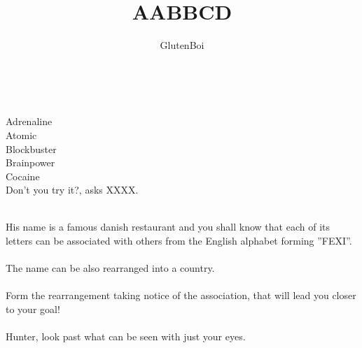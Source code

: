 \documentclass[12pt,a4paper]{article}
\author{GlutenBoi}
\title{AABBCD}
\date{}
\begin{document}
\maketitle
\ \\
\begin{center}
Adrenaline\\
Atomic\\
Blockbuster\\
Brainpower\\
Cocaine\\
Don't you try it?, asks XXXX.\\
\end{center}
\ \\
His name is a famous danish restaurant and you shall know
that each of its letters can be associated with others from the English alphabet
forming ”FEXI”.\\
\ \\
The name can be also rearranged into a country. \\
\ \\
Form
the rearrangement taking notice of the association, that will lead you closer to your
goal!\\
\ \\
Hunter, look past what can be seen with just your eyes.
\end{document}
